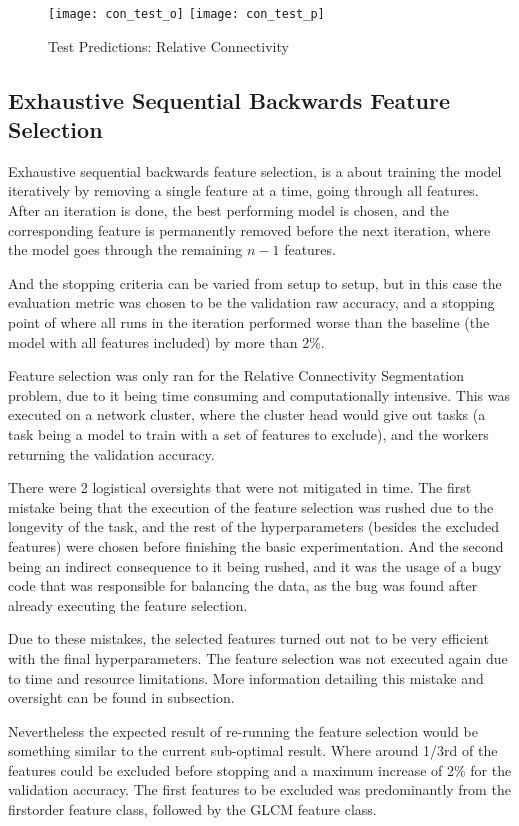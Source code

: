 \begin{figure}[H]
\centering
\texttt{[image: con\_test\_o]}
\texttt{[image: con\_test\_p]}
\caption{Test Predictions: Relative Connectivity}
\label{fig:pred-tes-con}
\end{figure}

\subsection{Exhaustive Sequential Backwards Feature Selection}
\label{sec:seqback}

Exhaustive sequential backwards feature selection, is a about training the model iteratively by removing a single feature at a time, going through all features. After an iteration is done, the best performing model is chosen, and the corresponding feature is permanently removed before the next iteration, where the model goes through the remaining $n-1$ features.\par
And the stopping criteria can be varied from setup to setup, but in this case the evaluation metric was chosen to be the validation raw accuracy, and a stopping point of where all runs in the iteration performed worse than the baseline (the model with all features included) by more than 2\%.\par
Feature selection was only ran for the Relative Connectivity Segmentation problem, due to it being time consuming and computationally intensive. This was executed on a network cluster, where the cluster head would give out tasks (a task being a model to train with a set of features to exclude), and the workers returning the validation accuracy.\par
There were 2 logistical oversights that were not mitigated in time. The first mistake being that the execution of the feature selection was rushed due to the longevity of the task, and the rest of the hyperparameters (besides the excluded features) were chosen before finishing the basic experimentation. And the second being an indirect consequence to it being rushed, and it was the usage of a bugy code that was responsible for balancing the data, as the bug was found after already executing the feature selection.\par
Due to these mistakes, the selected features turned out not to be very efficient with the final hyperparameters. The feature selection was not executed again due to time and resource limitations. More information detailing this mistake and oversight can be found in  subsection.\par
Nevertheless the expected result of re-running the feature selection would be something similar to the current sub-optimal result. Where around 1/3rd of the features could be excluded before stopping and a maximum increase of 2\% for the validation accuracy. The first features to be excluded was predominantly from the firstorder feature class, followed by the \ac{GLCM} feature class.

